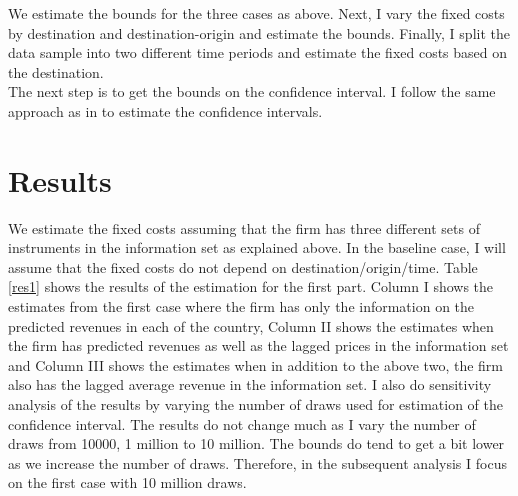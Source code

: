 \documentclass[11pt, letterpaper]{article} \usepackage{amsmath}
\begin{document}
We estimate the bounds for the three cases as above. Next, I vary the
fixed costs by destination and destination-origin and estimate the
bounds. Finally, I split the data sample into two different time
periods and estimate the fixed costs based on the
destination. \\
The next step is to get the bounds on the confidence interval. I
follow the same approach as in \citet{dickstein2018} to estimate the
confidence intervals. 
\section{Results}
We estimate the fixed costs assuming that the firm has three different
sets of instruments in the information set as explained above. In the
baseline case, I will assume that the fixed costs do not depend on
destination/origin/time. Table \ref{res1} shows the results of the
estimation for the first part. Column I shows the estimates from the
first case where the firm has only the information on the predicted
revenues in each of the country, Column II shows the estimates when
the firm has predicted revenues as well as the lagged prices in the
information set and Column III shows the estimates when in addition to
the above two, the firm also has the lagged average revenue in the
information set.  I also do sensitivity analysis of the results by
varying the number of draws used for estimation of the confidence
interval. The results do not change much as I vary the number of draws
from 10000, 1 million to 10 million. The bounds do tend to get a bit
lower as we increase the number of draws. Therefore, in the subsequent
analysis I focus on the first case with 10 million draws.
\end{document}
